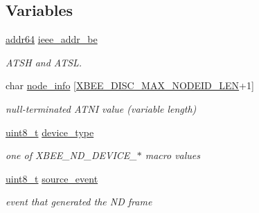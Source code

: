 \subsection*{Variables}
\begin{DoxyCompactItemize}
\item 
\mbox{\label{group__xbee__discovery_ga719f89263ecae9f127dc655c1c14fdac}} 
\hyperlink{unionaddr64}{addr64} \hyperlink{group__xbee__discovery_ga719f89263ecae9f127dc655c1c14fdac}{ieee\+\_\+addr\+\_\+be}
\begin{DoxyCompactList}\small\item\em A\+T\+SH and A\+T\+SL. \end{DoxyCompactList}\item 
\mbox{\label{group__xbee__discovery_gaa667bab3abb953bc14d9f5bcc36644b8}} 
char \hyperlink{group__xbee__discovery_gaa667bab3abb953bc14d9f5bcc36644b8}{node\+\_\+info} \mbox{[}\hyperlink{group__xbee__discovery_ga0df6e63d6ccca22fcf154b6f0be46da6}{X\+B\+E\+E\+\_\+\+D\+I\+S\+C\+\_\+\+M\+A\+X\+\_\+\+N\+O\+D\+E\+I\+D\+\_\+\+L\+EN}+1\mbox{]}
\begin{DoxyCompactList}\small\item\em null-\/terminated A\+T\+NI value (variable length) \end{DoxyCompactList}\item 
\mbox{\label{group__xbee__discovery_gab9c960832b7e834e6657e0c6ab4c3d8a}} 
\hyperlink{group__hal__dos_gae1affc9ca37cfb624959c866a73f83c2}{uint8\+\_\+t} \hyperlink{group__xbee__discovery_gab9c960832b7e834e6657e0c6ab4c3d8a}{device\+\_\+type}
\begin{DoxyCompactList}\small\item\em one of X\+B\+E\+E\+\_\+\+N\+D\+\_\+\+D\+E\+V\+I\+C\+E\+\_\+$\ast$ macro values \end{DoxyCompactList}\item 
\mbox{\label{group__xbee__discovery_ga0fb7817a87e8f275a4313c6629d189c7}} 
\hyperlink{group__hal__dos_gae1affc9ca37cfb624959c866a73f83c2}{uint8\+\_\+t} \hyperlink{group__xbee__discovery_ga0fb7817a87e8f275a4313c6629d189c7}{source\+\_\+event}
\begin{DoxyCompactList}\small\item\em event that generated the ND frame \end{DoxyCompactList}\item 

\end{DoxyCompactItemize}
